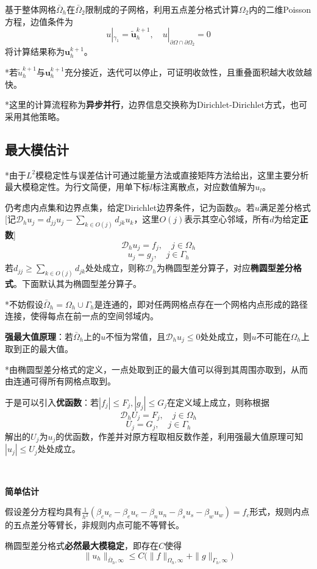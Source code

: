 \documentclass[a4paper,UTF8,fontset=windows]{ctexart}
\newcommand*{\bu}{\mathbf{u}}
\begin{document}
基于整体网格$\bar{\Omega}_h$在$\bar{\Omega}_2$限制成的子网格，利用五点差分格式计算$\Omega_2$内的二维Poisson方程，边值条件为
$$u|_{\gamma_1}=\tilde{\bu}_h^{k+1},\quad u|_{\partial\Omega\cap\partial\Omega_2}=0$$
将计算结果称为$\bu_h^{k+1}$。

*若$\tilde{u}_h^{k+1}$与$\bu_h^{k+1}$充分接近，迭代可以停止，可证明收敛性，且重叠面积越大收敛越快。

*这里的计算流程称为\textbf{异步并行}，边界信息交换称为Dirichlet-Dirichlet方式，也可采用其他策略。

\subsection{最大模估计}
*由于$L^2$模稳定性与误差估计可通过能量方法或直接矩阵方法给出，这里主要分析最大模稳定性。为行文简便，用单下标$l$标注离散点，对应数值解为$u_l$。

仍考虑内点集和边界点集，给定Dirichlet边界条件，记为函数$g$。若$u$满足差分格式[记$\mathcal{D}_hu_j=d_{jj}u_j-\sum_{k\in O(j)}d_{jk}u_k$，这里$O(j)$表示其空心邻域，所有$d$为给定\textbf{正数}]
$$\mathcal{D}_hu_j=f_j,\quad j\in\Omega_h$$
$$u_j=g_j,\quad j\in\Gamma_h$$
若$d_{jj}\ge\sum_{k\in O(j)}d_{jk}$处处成立，则称$\mathcal{D}_h$为椭圆型差分算子，对应\textbf{椭圆型差分格式}。下面默认其为椭圆型差分算子。

*不妨假设$\bar{\Omega}_h=\Omega_h\cup\Gamma_h$是连通的，即对任两网格点存在一个网格内点形成的路径连接，使得每点在前一点的空间邻域内。

\textbf{强最大值原理}：若$\bar{\Omega}_h$上的$u$不恒为常值，且$\mathcal{D}_hu_j\le0$处处成立，则$u$不可能在$\Omega_h$上取到正的最大值。

*由椭圆型差分格式的定义，一点处取到正的最大值可以得到其周围亦取到，从而由连通可得所有网格点取到。

于是可以引入\textbf{优函数}：若$|f_j|\le F_j,|g_j|\le G_j$在定义域上成立，则称根据
$$\mathcal{D}_hU_j=F_j,\quad j\in\Omega_h$$
$$U_j=G_j,\quad j\in\Gamma_h$$
解出的$U_j$为$u_j$的优函数，作差并对原方程取相反数作差，利用强最大值原理可知$|u_j|\le U_j$处处成立。

\

\textbf{简单估计}

假设差分方程均具有$\frac{1}{h^2}(\beta_cu_c-\beta_eu_e-\beta_nu_n-\beta_su_s-\beta_wu_w)=f_c$形式，规则内点的五点差分等臂长，非规则内点可能不等臂长。

椭圆型差分格式\textbf{必然最大模稳定}，即存在$C$使得
$$\|u_h\|_{\bar{\Omega}_h,\infty}\le C\big(\|f\|_{\Omega_h,\infty}+\|g\|_{\Gamma_h,\infty}\big)$$
\end{document}
